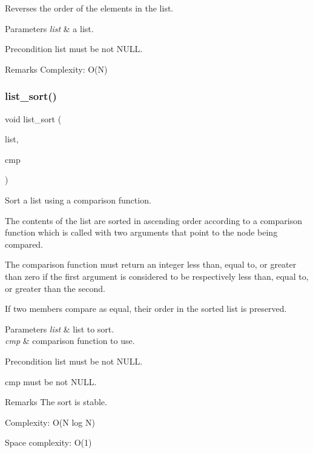 Reverses the order of the elements in the list.


\begin{DoxyParams}{Parameters}
{\em list} & a list.\\
\hline
\end{DoxyParams}
\begin{DoxyPrecond}{Precondition}
{\ttfamily list} must be not N\+U\+LL.
\end{DoxyPrecond}
\begin{DoxyRemark}{Remarks}
Complexity\+: O(\+N) 
\end{DoxyRemark}
\mbox{\label{list_8c_aafd30da5da0e55fa5510328f579e7830}} 
\subsubsection{list\+\_\+sort()}
{\footnotesize\ttfamily void list\+\_\+sort (\begin{DoxyParamCaption}\item[{struct \textbf{ list} $\ast$}]{list,  }\item[{int($\ast$)(struct \textbf{ list\+\_\+node} $\ast$, struct \textbf{ list\+\_\+node} $\ast$)}]{cmp }\end{DoxyParamCaption})\hspace{0.3cm}{\ttfamily [inline]}}

Sort a list using a comparison function.

The contents of the list are sorted in ascending order according to a comparison function which is called with two arguments that point to the node being compared.

The comparison function must return an integer less than, equal to, or greater than zero if the first argument is considered to be respectively less than, equal to, or greater than the second.

If two members compare as equal, their order in the sorted list is preserved.


\begin{DoxyParams}{Parameters}
{\em list} & list to sort. \\
\hline
{\em cmp} & comparison function to use.\\
\hline
\end{DoxyParams}
\begin{DoxyPrecond}{Precondition}
{\ttfamily list} must be not N\+U\+LL. 

{\ttfamily cmp} must be not N\+U\+LL.
\end{DoxyPrecond}
\begin{DoxyRemark}{Remarks}
The sort is stable. 

Complexity\+: O(\+N log N) 

Space complexity\+: O(1) 
\end{DoxyRemark}
\mbox{\label{list_8c_ac55d3781f4c83cba6000c29161e3a419}} 
